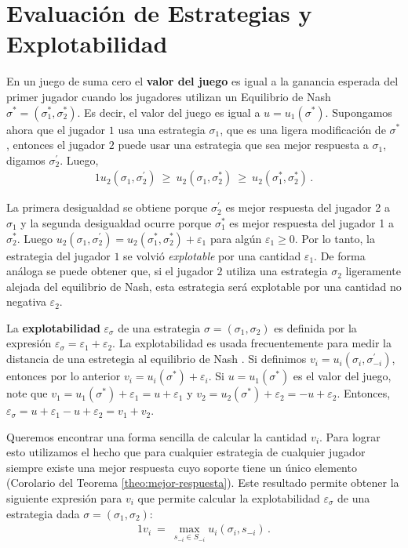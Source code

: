 \chapter{Evaluación de Estrategias y Explotabilidad}
\label{section:explotabilidad}

En un juego de suma cero el \textbf{valor del juego} es igual a la ganancia esperada del primer jugador cuando los jugadores utilizan un Equilibrio de Nash $\sigma^* = (\sigma^*_1, \sigma^*_2)$. Es decir, el valor del juego es igual a $u = u_1(\sigma^*)$. Supongamos ahora que el jugador $1$  usa una estrategia $\sigma_1$, que es una ligera modificación de $\sigma^*$, entonces el jugador $2$ puede usar una estrategia que sea mejor respuesta a $\sigma_1$, digamos $\sigma^{\prime}_2$. Luego,
\begin{alignat}{1}
u_2(\sigma_1, \sigma^{\prime}_2)\ \geq\ u_2(\sigma_1, \sigma^*_2)\ \geq\ u_2(\sigma^*_1, \sigma^*_2) \,.
\end{alignat}

La primera desigualdad se obtiene porque $\sigma^{\prime}_2$ es mejor respuesta del jugador 2 a $\sigma_1$ y la segunda desigualdad ocurre porque $\sigma^*_1$ es mejor respuesta del jugador 1 a $\sigma^*_2$. Luego $u_2(\sigma_1, \sigma^{\prime}_2) = u_2(\sigma^*_1, \sigma^*_2) + \varepsilon_1$ para algún $\varepsilon_1 \geq 0$. Por lo tanto, la estrategia del jugador $1$ se volvió \textit{explotable} por una cantidad $\varepsilon_1$. De forma análoga se puede obtener que, si el jugador $2$ utiliza una estrategia $\sigma_2$ ligeramente alejada del equilibrio de Nash, esta estrategia será explotable por una cantidad no negativa $\varepsilon_2$.

La \textbf{explotabilidad} $\varepsilon_\sigma$ de una estrategia $\sigma = (\sigma_1, \sigma_2)$ es definida por la expresión $\varepsilon_{\sigma} = \varepsilon_1 + \varepsilon_2$. La explotabilidad es usada frecuentemente para medir la distancia de una estretegia al equilibrio de Nash \cite[p. 7]{bib:thesis-marc-lanctot}. Si definimos $v_i = u_i(\sigma_i, \sigma^{\prime}_{-i})$, entonces por lo anterior $v_i = u_i(\sigma^*) + \varepsilon_i$. Si $u=u_1(\sigma^*)$ es el valor del juego, note que $v_1 = u_1(\sigma^*) + \varepsilon_1 = u + \varepsilon_1$ y $v_2 = u_2(\sigma^*) + \varepsilon_2 = -u + \varepsilon_2$. Entonces,  $\varepsilon_{\sigma} = u + \varepsilon_1 - u + \varepsilon_2 =  v_1 + v_2$.

Queremos encontrar una forma sencilla de calcular la cantidad $v_i$. Para lograr esto utilizamos el hecho que para cualquier estrategia de cualquier jugador siempre existe una mejor respuesta cuyo soporte tiene un único elemento (Corolario del Teorema \ref{theo:mejor-respuesta}). Este resultado permite obtener la siguiente expresión para $v_i$ que permite calcular la explotabilidad $\varepsilon_\sigma$ de una estrategia dada $\sigma=(\sigma_1,\sigma_2)$:
\begin{alignat}{1}
v_i\ =\ \max_{s_{-i} \in S_{-i}} u_i(\sigma_i, s_{-i}) \,.
\end{alignat}

